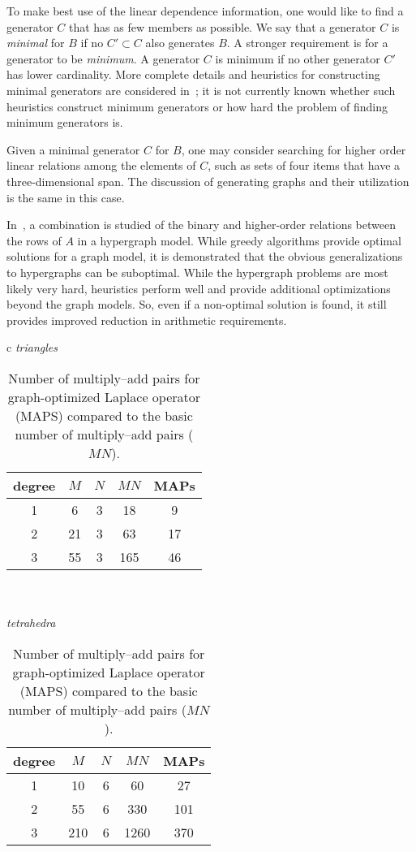 To make best use of the linear dependence information, one would like
to find a generator $C$ that has as few members as possible.  We
say that a generator $C$ is \emph{minimal} for $B$ if no $C'
\subset C$ also generates $B$. A stronger requirement is for a
generator to be \emph{minimum}. A generator $C$ is minimum if no other
generator $C'$ has lower cardinality.  More complete details and
heuristics for constructing minimal generators are considered
in~\cite{KirbyScott2007}; it is not currently known whether such
heuristics construct minimum generators or how hard the problem of
finding minimum generators is.

Given a minimal generator $C$ for $B$, one may consider searching for
higher order linear relations among the elements of $C$, such as sets
of four items that have a three-dimensional span.  The discussion of
generating graphs and their utilization is the same in this case.

In~\cite{WolfHeath2009}, a combination is studied of the binary and
higher-order relations between the rows of $A$ in a hypergraph model.
While greedy algorithms provide optimal solutions for a graph model,
it is demonstrated that the obvious generalizations to hypergraphs can
be suboptimal. While the hypergraph problems are most likely very
hard, heuristics perform well and provide additional optimizations
beyond the graph models. So, even if a non-optimal solution is found,
it still provides improved reduction in arithmetic requirements.

\begin{table}
  \begin{center}
    \begin{tabular}{c}
      \emph{triangles} \\
      \begin{tabular}{|c|ccc|c|}\hline
        degree & $M$ & $N$ & $MN$ & MAPs \\
        \hline
        \hline
        1 &6 &3& 18& 9 \\
        2 &21& 3& 63& 17\\
        3 &55& 3& 165& 46 \\\hline
      \end{tabular}
      \\
      \\
      \emph{tetrahedra} \\
      \begin{tabular}{|c|ccc|c|}\hline
        degree & $M$ & $N$ & $MN$ & MAPs \\
        \hline
        \hline
        1 & 10 & 6 &60 &27 \\
        2 & 55 & 6 & 330 &101 \\
        3 & 210 &6 &1260 &370 \\\hline
      \end{tabular}
    \end{tabular}
    \label{tab:kirby-4:graph}
    \caption{Number of multiply--add pairs for graph-optimized Laplace
      operator (MAPS) compared to the basic number of multiply--add pairs ($MN$).}
  \end{center}
\end{table}

